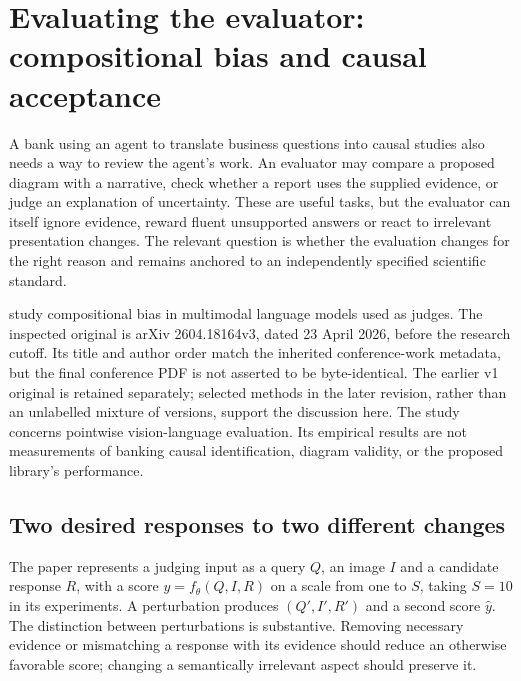 \section{Evaluating the evaluator: compositional bias and causal acceptance}
\label{sec:exec24-judge-bias}

A bank using an agent to translate business questions into causal studies also
needs a way to review the agent's work. An evaluator may compare a proposed
diagram with a narrative, check whether a report uses the supplied evidence,
or judge an explanation of uncertainty. These are useful tasks, but the
evaluator can itself ignore evidence, reward fluent unsupported answers or
react to irrelevant presentation changes. The relevant question is whether
the evaluation changes for the right reason and remains anchored to an
independently specified scientific standard.\citep{exec24_judgebias_reference}

\citet{exec24_judgebias_original} study compositional bias in multimodal
language models used as judges. The inspected original is arXiv
2604.18164v3, dated 23 April 2026, before the research cutoff. Its title and
author order match the inherited conference-work metadata, but the final
conference PDF is not asserted to be byte-identical. The earlier v1 original
is retained separately; selected methods in the later revision, rather than
an unlabelled mixture of versions, support the discussion here.
The study concerns pointwise vision-language evaluation. Its empirical
results are not measurements of banking causal identification, diagram
validity, or the proposed library's performance.
\citep{exec24_judgebias_original}

\subsection{Two desired responses to two different changes}

The paper represents a judging input as a query $Q$, an image $I$ and a
candidate response $R$, with a score $y=f_\theta(Q,I,R)$ on a scale from one
to $S$, taking $S=10$ in its experiments. A perturbation produces
$(Q',I',R')$ and a second score $\widehat y$. The distinction between
perturbations is substantive. Removing necessary evidence or mismatching a
response with its evidence should reduce an otherwise favorable score;
changing a semantically irrelevant aspect should preserve it.
\citep{exec24_judgebias_original}

